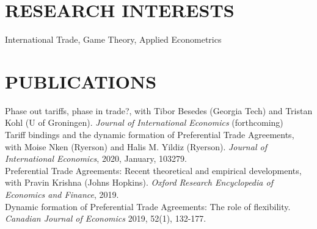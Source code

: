 \documentclass[11pt]{res}
\begin{document}
\begin{resume}
\section{RESEARCH INTERESTS}\vspace{1.5mm}
International Trade, Game Theory, Applied Econometrics

\section{PUBLICATIONS}\vspace{1.5mm}
{Phase out tariffs, phase in trade?}, with Tibor Besedes (Georgia Tech) and Tristan Kohl (U of Groningen). \emph{Journal of International Economics} (forthcoming)\vspace{1.5mm}\\
{Tariff bindings and the dynamic formation of Preferential Trade Agreements}, with Moise Nken (Ryerson) and Halis M. Yildiz (Ryerson). \emph{Journal of International Economics}, 2020, January, 103279.\vspace{1.5mm}\\
{Preferential Trade Agreements: Recent theoretical and empirical developments}, with Pravin Krishna (Johns Hopkins). \emph{Oxford Research Encyclopedia of Economics and Finance}, 2019.\vspace{1.5mm}\\
{Dynamic formation of Preferential Trade Agreements: The role of flexibility}. \emph{Canadian Journal of Economics} 2019, 52(1), 132-177. \vspace{1.5mm}\\



\end{resume}
\end{document}
